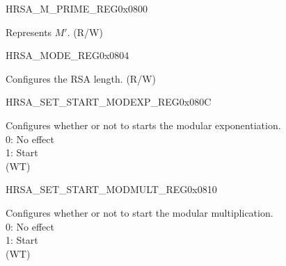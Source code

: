 \begin{register}{H}{RSA\_M\_PRIME\_REG}{0x0800}\label{regdesc:RSAMPRIMEREG}
%
\regnewline%
\begin{regdesc}\begin{reglist}
\label{fielddesc:RSAMPRIME}\item [RSA\_M\_PRIME] Represents $M'$. (R/W)
\end{reglist}\end{regdesc}
\end{register}


\begin{register}{H}{RSA\_MODE\_REG}{0x0804}\label{regdesc:RSAMODEREG}
%
%
\regnewline%
\begin{regdesc}\begin{reglist}
\label{fielddesc:RSAMODE}\item [RSA\_MODE] Configures the RSA length. (R/W)
\end{reglist}\end{regdesc}
\end{register}


\begin{register}{H}{RSA\_SET\_START\_MODEXP\_REG}{0x080C}\label{regdesc:RSASETSTARTMODEXPREG}
%
%
\regnewline%
\begin{regdesc}\begin{reglist}
\label{fielddesc:RSASETSTARTMODEXP}\item [RSA\_SET\_START\_MODEXP] Configures whether or not to starts the modular exponentiation. \\
0: No effect\\
1: Start\\
 (WT)
\end{reglist}\end{regdesc}
\end{register}


\begin{register}{H}{RSA\_SET\_START\_MODMULT\_REG}{0x0810}\label{regdesc:RSASETSTARTMODMULTREG}
%
%
\regnewline%
\begin{regdesc}\begin{reglist}
\label{fielddesc:RSASETSTARTMODMULT}\item [RSA\_SET\_START\_MODMULT] Configures whether or not to start the modular multiplication.\\
0: No effect\\
1: Start\\
 (WT)
\end{reglist}\end{regdesc}
\end{register}


